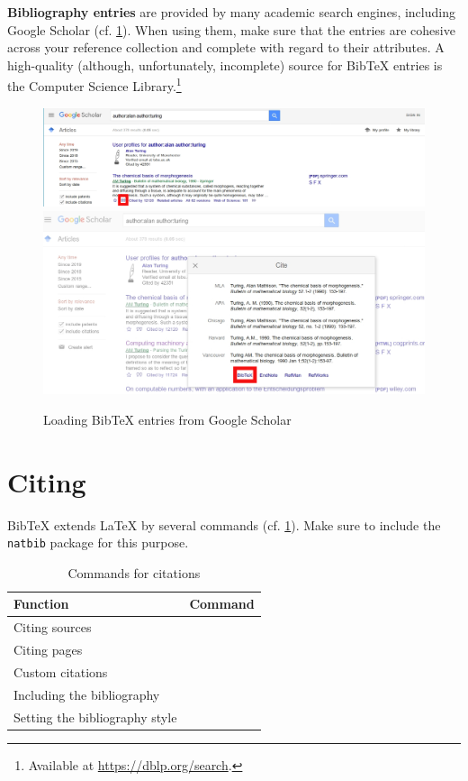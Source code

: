 \textbf{Bibliography entries} are provided by many academic search engines, including Google Scholar (cf. \cref{fig:google-scholar-bibtex}).
When using them, make sure that the entries are cohesive across your reference collection and complete with regard to their attributes.
A high-quality (although, unfortunately, incomplete) source for Bib\TeX{} entries is the  Computer Science Library.\footnote{Available at \url{https://dblp.org/search}.}

\begin{figure}[H]
  \includegraphics[width=\textwidth]{graphics/google_bibtex1.jpg}  
  \includegraphics[width=\textwidth]{graphics/google_bibtex2.jpg}  
  \caption{Loading Bib\TeX{} entries from Google Scholar}
  \label{fig:google-scholar-bibtex}
\end{figure}

\section{Citing}
Bib\TeX{} extends \LaTeX{} by several commands (cf. \cref{tbl:bibtex-commands}). 
Make sure to include the \texttt{natbib} package for this purpose.

\begin{table}[H]
  \centering
  \begin{tabular}{ll}
  \toprule
  Function                 & Command \\ \midrule
  Citing sources           & \texttt{\cite{<source>}} \\
  Citing pages             & \texttt{\cite[p. 15]{<source>}} \\
  Custom citations         & \texttt{\cite[<prefix>][<suffix>]{<source>}} \\
  Including the bibliography     & \texttt{} \\
  Setting the bibliography style & \texttt{} \\ \bottomrule
  \end{tabular}
  \caption{Commands for citations}
  \label{tbl:bibtex-commands}
\end{table}


